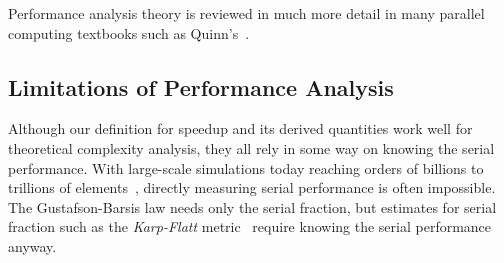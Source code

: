 \documentclass{llncs}
\newcommand*{\lcite}[1]{~\cite{#1}}
\newcommand*{\scite}[1]{~\cite{#1}}
\newcommand*{\keyterm}[1]{\emph{#1}}
\begin{document}
Performance analysis theory is reviewed in much more detail in many
parallel computing textbooks such as Quinn's\scite{Quinn2004}.

\subsection{Limitations of Performance Analysis}

\noindent
Although our definition for speedup and its derived quantities work well
for theoretical complexity analysis, they all rely in some way on knowing
the serial performance. With large-scale simulations today reaching orders
of billions to trillions of
elements\lcite{Bernaschi2013,Rossinelli2013,Bussmann2013,Habib2013},
directly measuring serial performance is often impossible. The Gustafson-Barsis
law needs only the serial fraction, but estimates for serial
fraction such as the \keyterm{Karp-Flatt} metric\lcite{Karp1990} require
knowing the serial performance anyway.



\end{document}
